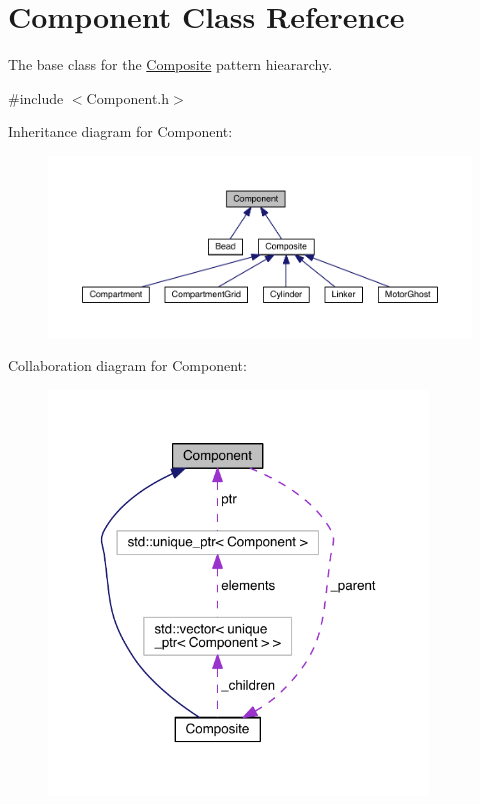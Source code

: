 \hypertarget{classComponent}{\section{Component Class Reference}
\label{classComponent}
}


The base class for the \hyperlink{classComposite}{Composite} pattern hieararchy.  




{\ttfamily \#include $<$Component.\+h$>$}



Inheritance diagram for Component\+:
\nopagebreak
\begin{figure}[H]
\begin{center}
\leavevmode
\includegraphics[width=350pt]{classComponent__inherit__graph}
\end{center}
\end{figure}


Collaboration diagram for Component\+:\nopagebreak
\begin{figure}[H]
\begin{center}
\leavevmode
\includegraphics[width=286pt]{classComponent__coll__graph}
\end{center}
\end{figure}
